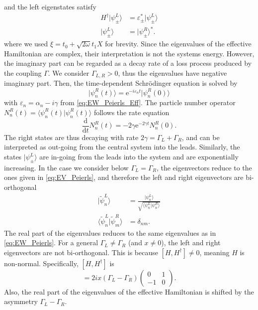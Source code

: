 \documentclass{article}
\newcommand{\exP}[1]{\mathrm{e}^{#1}}
\newcommand{\dif}{\mathrm{d}}
\begin{document}
and the left eigenstates satisfy
\begin{align}
	H^\dagger \vert \psi_\pm^L\rangle &= \varepsilon_\pm^* \vert \psi_\pm^L\rangle\\
	\vert \psi_\pm^L\rangle &= \vert \psi_\pm^R\rangle^*.
\end{align}
where we used $\xi=t_0+\sqrt{2\omega}t_1X$ for brevity. Since the eigenvalues of the effective Hamiltonian are complex, their interpretation is not the systems energy.
However, the imaginary part can be regarded as a decay rate of a loss process produced by the coupling $\Gamma$. 
We consider $\Gamma_{L,R}>0$, thus the eigenvalues have negative imaginary part. Then, the time-dependent Schrödinger equation is solved by 
\begin{equation}
	\vert \psi^R_n(t)\rangle = \exP{-i\varepsilon_n t}\vert\psi_n^R(0)\rangle
\end{equation}
with $\varepsilon_n = \alpha_n -i\gamma$ from \cref{eq:EW_Peierls_Eff}.
The particle number operator $N^R_n(t) = \langle \psi^R_n(t)\vert \psi^R_n(t)\rangle$ follows the rate equation 
\begin{equation}
	\frac{\dif}{\dif t}N^R_n(t) = -2\gamma \exP{-2\gamma t}N^R_n(0).
\end{equation}
The right states are thus decaying with rate $2\gamma = \Gamma_L+\Gamma_R$, and can be interpreted as out-going from the central system into the leads. 
Similarly, the states $\vert \psi_\pm^L\rangle$ are in-going from the leads into the system and are exponentially increasing.
In the case we consider below $\Gamma_L = \Gamma_R$, the eigenvectors reduce to the ones given in \cref{eq:EV_Peierls}, and therefore the left and right eigenvectors are bi-orthogonal
\begin{align}
	\vert\tilde{\psi}_n^L\rangle &= \frac{\vert \psi_n^L\rangle}{\sqrt{\langle \psi_n^L\vert\psi_n^R \rangle}}\\
	\langle \tilde{\psi}^L_n\vert  \tilde{\psi}^R_m\rangle &= \delta_{nm}.
\end{align}  
The real part of the eigenvalues reduces to the same eigenvalues as in \cref{eq:EW_Peierls}. 
For a general $\Gamma_L\neq \Gamma_R$ (and $x\neq 0$), the left and right eigenvectors are not bi-orthogonal. This is because $[H,H^\dagger]\neq 0$, meaning $H$ is non-normal.
Specifically, $[H,H^\dagger]$ is
\begin{equation}
	[H,H^\dagger] = 2ix (\Gamma_L-\Gamma_R)\begin{pmatrix}
		0  & 1\\
		-1 & 0
	\end{pmatrix}.
\end{equation}
Also, the real part of the eigenvalues of the effective Hamiltonian is shifted by the  asymmetry $\Gamma_L-\Gamma_R$.
\end{document}

